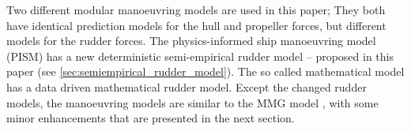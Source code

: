 Two different modular manoeuvring models are used in this paper; They both have identical prediction models for the hull and propeller forces, but different models for the rudder forces. The physics-informed ship manoeuvring model (PISM) has a new deterministic semi-empirical rudder model -- proposed in this paper (see \autoref{sec:semiempirical_rudder_model}). The so called mathematical model has a data driven mathematical rudder model. 
Except the changed rudder models, the manoeuvring models are similar to the MMG model \citep{yasukawa_introduction_2015}, with some minor enhancements that are presented in the next section.